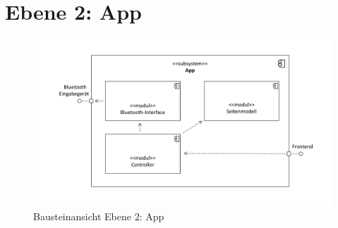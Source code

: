 \section{Ebene 2: App}

\begin{figure}[h]
\begin{center}
\includegraphics[scale=0.5]{Grafiken/Baustein_2.pdf}
\caption{Bausteinansicht Ebene 2: App}
\end{center}
\end{figure}
